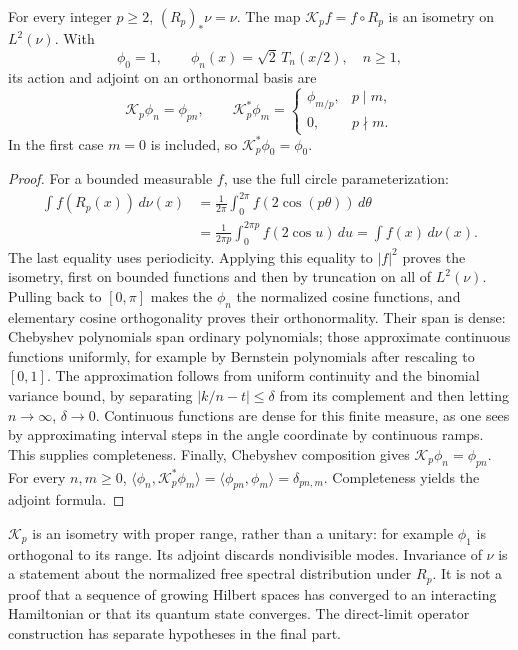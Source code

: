 \begin{proposition}
\label{a-spectral-arcsine-invariance}
For every integer $p\geq2$, $(R_p)_*\nu=\nu$. The map
$\mathcal K_pf=f\circ R_p$ is an isometry on $L^2(\nu)$. With
\[
 \phi_0=1,\qquad \phi_n(x)=\sqrt2\,T_n(x/2),\quad n\geq1,
\]
its action and adjoint on an orthonormal basis are
\begin{equation}
 \mathcal K_p\phi_n=\phi_{pn},\qquad
 \mathcal K_p^*\phi_m=
 \begin{cases}\phi_{m/p},&p\mid m,\\0,&p\nmid m.\end{cases}
 \label{a-spectral-koopman-routing}
\end{equation}
In the first case $m=0$ is included, so $\mathcal K_p^*\phi_0=\phi_0$.
\end{proposition}
\begin{proof}
For a bounded measurable $f$, use the full circle parameterization:
\begin{align*}
 \int f(R_p(x))\,d\nu(x)
 &=\frac1{2\pi}\int_0^{2\pi}f(2\cos(p\theta))\,d\theta\\
 &=\frac1{2\pi p}\int_0^{2\pi p}f(2\cos u)\,du
 =\int f(x)\,d\nu(x).
\end{align*}
The last equality uses periodicity. Applying this equality to $|f|^2$
proves the isometry, first on bounded functions and then by truncation
on all of $L^2(\nu)$. Pulling back to $[0,\pi]$ makes the $\phi_n$
the normalized cosine functions, and elementary cosine orthogonality
proves their orthonormality. Their span is dense: Chebyshev polynomials
span ordinary polynomials; those approximate continuous functions
uniformly, for example by Bernstein polynomials after rescaling to
$[0,1]$. The approximation follows from uniform continuity and the
binomial variance bound, by separating $|k/n-t|\leq\delta$ from its
complement and then letting $n\to\infty$, $\delta\to0$.
Continuous functions are dense for this finite measure, as one sees by
approximating interval steps in the angle coordinate by continuous
ramps. This supplies completeness.
Finally, Chebyshev composition gives $\mathcal K_p\phi_n=\phi_{pn}$.
For every $n,m\geq0$,
$\langle\phi_n,\mathcal K_p^*\phi_m\rangle
=\langle\phi_{pn},\phi_m\rangle=\delta_{pn,m}$.
Completeness yields the adjoint formula.
\end{proof}

$\mathcal K_p$ is an isometry with proper range, rather than a unitary:
for example $\phi_1$ is orthogonal to its range. Its adjoint discards
nondivisible modes. Invariance of $\nu$ is a statement about the
normalized free spectral distribution under $R_p$. It is not a proof
that a sequence of growing Hilbert spaces has converged to an interacting
Hamiltonian or that its quantum state converges. The direct-limit
operator construction has separate hypotheses in the final part.

